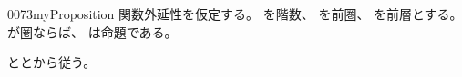 \documentclass[index]{subfiles}
\begin{document}
\begin{myBlock}{0073}{myProposition}
  関数外延性を仮定する。
  を階数、
  を前圏、
  を前層とする。
  が圏ならば、
  は命題である。
\end{myBlock}
\begin{myProof}
  ととから従う。
\end{myProof}
\end{document}
